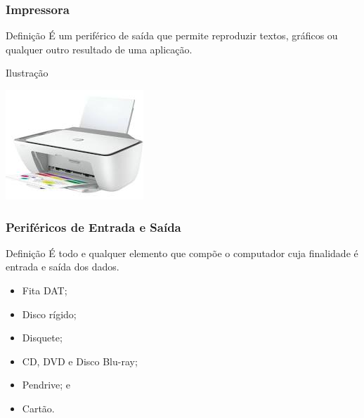 \documentclass[aspectratio=169]{beamer} %
\begin{document}
\begin{frame}
	\frametitle{Impressora}
	
	\begin{block}{Defini\c cão}
		É um periférico de saída que permite reproduzir textos, gráficos ou qualquer outro resultado de uma aplicação.
	\end{block}\vfill
	
	\begin{exampleblock}{Ilustra\c cão}
		\begin{center}
			\includegraphics[scale=0.5]{img/impressora}
		\end{center}		
	\end{exampleblock}
\end{frame}

\begin{frame}
	\frametitle{Periféricos de Entrada e Saída}
	
	\begin{block}{Defini\c cão}
		É todo e qualquer elemento que compõe o computador cuja finalidade é entrada e saída dos dados.
	\end{block}\vfill
	
	\begin{itemize}
		\item Fita DAT;
		\item Disco rígido;
		\item Disquete;
		\item CD, DVD e Disco Blu-ray; 
		\item Pendrive; e
		\item Cartão.
	\end{itemize}
\end{frame}
\end{document}
